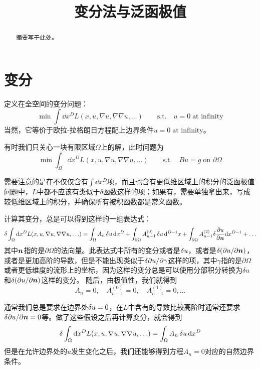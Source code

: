 \documentclass[UTF8]{ctexart}
\title{变分法与泛函极值}
\newcommand*{\st}{\quad \text{s.t.} \quad}
\begin{document}
\maketitle

\begin{abstract}
    摘要写于此处。
\end{abstract}

\section{变分}

定义在全空间的变分问题：
\begin{equation}
    \min \int \dd x^D L(x, u, \nabla u, \nabla \nabla u, \ldots) \quad \st u = 0 \; \text{at infinity}
\end{equation}
当然，它等价于欧拉-拉格朗日方程配上边界条件$u = 0 \; \text{at infinity}$。

有时我们只关心一块有限区域$\Omega$上的解，此时问题为
\begin{equation}
    \min \int_\Omega \dd x^D L(x, u, \nabla u, \nabla \nabla u, \ldots) \quad \st B u = g \; \text{on $\partial \Omega$}
\end{equation}

需要注意的是在不仅仅含有$\int \dd x^D$项，而且也含有更低维区域上的积分的泛函极值问题中，$L$中都不应该有类似于$\delta$函数这样的项；如果有，需要单独拿出来，写成较低维区域上的积分，并确保所有被积函数都是常义函数。

计算其变分，总是可以得到这样的一组表达式：
\begin{equation}
    \delta \int_\Omega \dd x^D L(x, u, \nabla u, \nabla \nabla u, \ldots) = \int_\Omega A_n \var{u} \dd x^D + \int_{\partial \Omega} A_{n-1}^{(0)} \var{u} \dd^{D-1}x + \int_{\partial \Omega} A_{n-1}^{(2)} \delta \pdv{u}{\vb*{n}} \dd x^{D-1} + \ldots
\end{equation}
其中$\vb*{n}$指的是$\partial \Omega$的法向量。此表达式中所有的变分或者是$\var{u}$，或者是$\var{(\partial u / \partial \vb*{n})}$，或者是更加高阶的导数，但是不能出现类似于$\var{\partial u / \partial \gamma}$这样的项，其中$\gamma$指的是$\partial \Omega$或者更低维度的流形上的坐标，因为这样的变分总是可以使用分部积分转换为$\delta u$和$\var{(\partial u / \partial \vb*{n})}$这样的变分。
随后，由极值性，我们就得到
\[
    A_n = 0, \quad A_{n-1}^{(0)} = 0, \quad A_{n-1}^{(1)} = 0, \ldots
\]

通常我们总是要求在边界处$\var{u}=0$，在$L$中含有的导数比较高阶时通常还要求$\delta \partial u / \partial \vb*{n}=0$等。做了这些假设之后再计算变分，就会得到
\[
    \delta \int_\Omega \dd x^D L(x, u, \nabla u, \nabla \nabla u, \ldots) = \int_\Omega A_n \var{u} \dd x^D
\]
但是在允许边界处的$u$发生变化之后，我们还能够得到方程$A_n = 0$对应的自然边界条件。
\end{document}
